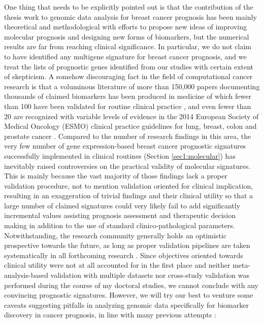 One thing that needs to be explicitly pointed out is that the contribution of the thesis work to genomic data analysis for breast cancer prognosis has been mainly theoretical and methodological with efforts to propose new ideas of improving molecular prognosis and designing new forms of biomarkers, but the numerical results are far from reaching clinical significance. In particular, we do not claim to have identified any multigene signature for breast cancer prognosis, and we treat the lists of prognostic genes identified from our studies with certain extent of skepticism. A somehow discouraging fact in the field of computational cancer research is that a voluminous literature of more than 150,000 papers documenting thousands of claimed biomarkers has been produced in medicine of which fewer than 100 have been validated for routine clinical practice \cite{Poste2011Bring}, and even fewer than 20 are recognized with variable levels of evidence in the 2014 European Society of Medical Oncology (ESMO) clinical practice guidelines for lung, breast, colon and prostate cancer \cite{Schneider2015Establishing}. Compared to the number of research findings in this area, the very few number of gene expression-based breast cancer prognostic signatures successfully implemented in clinical routines (Section \ref{sec1:molecular}) has inevitably raised controversies on the practical validity of molecular signatures. This is mainly because the vast majority of those findings lack a proper validation procedure, not to mention validation oriented for clinical implication, resulting in an exaggeration of trivial findings and their clinical utility so that a large number of claimed signatures could very likely fail to add significantly incremental values assisting prognosis assessment and therapeutic decision making in addition to the use of standard clinico-pathological parameters. Notwithstanding, the research community generally holds an optimistic prospective towards the future, as long as proper validation pipelines are taken systematically in all forthcoming research \cite{Michiels2016Statistical}. Since objectives oriented towards clinical utility were not at all accounted for in the first place and neither meta-analysis-based validation with multiple datasets nor cross-study validation was performed during the course of my doctoral studies, we cannot conclude with any convincing prognostic signatures. However, we will try our best to venture some caveats suggesting pitfalls in analyzing genomic data specifically for biomarker discovery in cancer prognosis, in line with many previous attempts \cite{Ambroise2002Selection, Simon2003Pitfalls, Issaq2011Cancer, Weigelt2012Challenges}:


